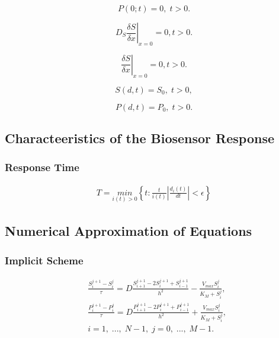 \documentclass[12pt, a4paper, lithuanian]{article}
\begin{document}
\begin{equation} 
    P(0;t)=0, \; t>0.
\end{equation}

\begin{equation} 
    \left. D_S \frac{\delta S}{\delta x} \right|_{x=0} = 0, t>0.
\end{equation}

\begin{equation} 
    \left. \frac{\delta S}{\delta x} \right|_{x=0} = 0, t>0.
\end{equation}

\begin{equation} 
    S(d, t) = S_0,\; t>0,
\end{equation}

\begin{equation} 
    P(d, t) = P_0,\; t>0.
\end{equation}

\subsection{Characteeristics of the Biosensor Response}
\subsubsection{Response Time}
\begin{equation} 
\begin{aligned}
    T = \underset{i(t)>0}{min}\left\{t:\frac{t}{i(t)} \left| \frac{d_i(t)}{dt}
    \right| < \epsilon \right\}
\end{aligned}
\end{equation}

\subsection{Numerical Approximation of Equations}
\subsubsection{Implicit Scheme}

\begin{equation}
\begin{aligned} 
    &\frac{S_i^{j+1} - S_i^j}{\tau} = D\frac{S_{i+1}^{j+1} -
    2S_i^{j+1} + S_{i-1}^{j+1}}{h^2} -
    \frac{V_{max} S_i^j}{K_M + S_i^j},\\ 
    &\frac{P_i^{j+1} - P_i^j}{\tau} = D\frac{P_{i+1}^{j+1} -
    2P_i^{j+1} + P_{i-1}^{j+1}}{h^2} +
    \frac{V_{max} S_i^j}{K_M + S_i^j},\\ 
    &i = 1,\;...,\; N-1,\; j=0,\;...,\;M-1.
\end{aligned}
\end{equation}
\end{document}
